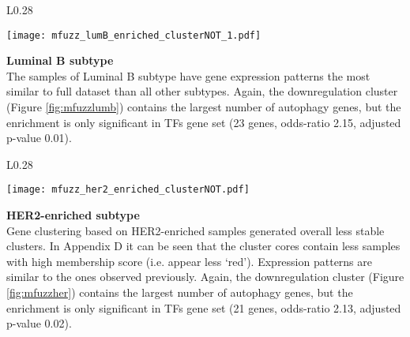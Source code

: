         \begin{wrapfigure}{L}{0.28\textwidth}
        \hfill
        \captionsetup{justification=centering}
        \centerline{ \texttt{[image: mfuzz\_lumB\_enriched\_clusterNOT\_1.pdf]}}
        \vspace*{-8mm}
        \caption[Luminal B subtype downregulation cluster]{\label{fig:mfuzzlumb}Luminal B\newline downregulation cluster}
        \end{wrapfigure}
        
        
        \textbf{Luminal B subtype}\\      
        The samples of Luminal B subtype have gene expression patterns the most similar to full dataset than all other subtypes. Again, the downregulation cluster (Figure \ref{fig:mfuzzlumb}) contains the largest number of autophagy genes, but the enrichment is only significant in TFs gene set (23 genes, odds-ratio 2.15, adjusted p-value 0.01). 
        \newline
        \newline
        \newline
        \newline
        \newline

      
        \begin{wrapfigure}{L}{0.28\textwidth}
        \hfill
        \captionsetup{justification=centering}
        \centerline{ \texttt{[image: mfuzz\_her2\_enriched\_clusterNOT.pdf]}}
        \vspace*{-8mm}
        \caption[HER2-enriched subtype downregulation cluster]{\label{fig:mfuzzher}HER2-enriched \newline downregulation cluster}
        \end{wrapfigure}
     
     
        \textbf{HER2-enriched subtype}\\   
        Gene clustering based on HER2-enriched samples generated overall less stable clusters. In Appendix D it can be seen that the cluster cores contain less samples with high membership score (i.e. appear less ‘red'). Expression patterns are similar to the ones observed previously. Again, the downregulation cluster (Figure \ref{fig:mfuzzher}) contains the largest number of autophagy genes, but the enrichment is only significant in TFs gene set (21 genes, odds-ratio 2.13, adjusted p-value 0.02).
        \newline
        \newline
        \newline        


